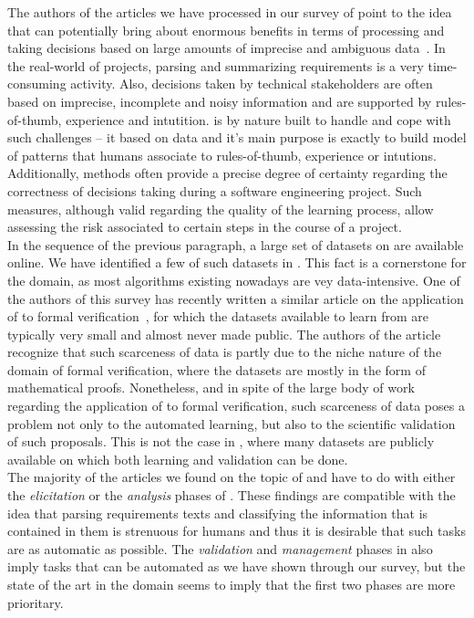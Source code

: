 The authors of the articles we have processed in our survey of point
to the idea that \ML can potentially bring about enormous benefits in terms of
processing and taking decisions based on  large amounts of imprecise and
ambiguous data~\cite{some citations here}. In the real-world of projects,
parsing and summarizing requirements is a very time-consuming activity. Also,
decisions taken by technical stakeholders are often based on imprecise,
incomplete and noisy information and are supported by rules-of-thumb, experience
and intutition. \ML is by nature built to handle and cope with such challenges
-- it based on data and it's main purpose is exactly to build model of patterns
that humans associate to rules-of-thumb, experience or intutions. Additionally,
\ML methods often provide a precise degree of certainty regarding the
correctness of decisions taking during a software engineering project. Such
measures, although valid regarding the quality of the learning process, allow
assessing the risk associated to certain steps in the course of a project.\\

In the sequence of the previous paragraph, a large set of datasets
on \RE are available online. We have identified a few of such datasets in
. This fact is a cornerstone for the domain, as most \ML
algorithms existing nowadays are vey data-intensive. One of the authors of this
survey has recently written a similar article on the application of \ML to
formal verification~\cite{AmLuBi:2018}, for which the datasets available
to learn from are typically very small and almost never made public. The authors
of the article recognize that such scarceness of data is partly due to the niche
nature of the domain of formal verification, where the datasets are mostly in
the form of mathematical proofs. Nonetheless, and in spite of the large body of
work regarding the application of \ML to formal verification, such scarceness of
data poses a problem not only to the automated learning, but also to the
scientific validation of such proposals. This is not the case in \RE, where many
datasets are publicly available on which both learning and validation can be
done.\\

The majority of the articles we found on the topic of \ML and \RE have to do
with either the \emph{elicitation} or the \emph{analysis} phases of \RE{}. These findings are compatible with the idea that parsing
requirements texts and classifying the information that is contained in them is
strenuous for humans and thus it is desirable that such tasks are as automatic
as possible. The \emph{validation} and \emph{management} phases in \RE also
imply tasks that can be automated as we have shown through our survey, but
the state of the art in the domain seems to imply that the first two phases are
more prioritary. 




